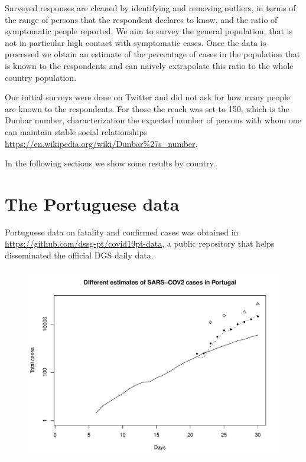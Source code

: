 \documentclass{article}
\begin{document}
Surveyed responses are cleaned by identifying and removing outliers, in terms of the range of persons that the respondent declares to know, and the ratio of symptomatic people reported. We aim to survey the general population, that is not in particular high contact with symptomatic cases. Once the data is processed we obtain an estimate of the percentage of cases in the population that is known to the respondents and can naively extrapolate this ratio to the whole country population. 


Our initial surveys were done on Twitter and did not ask for how many people are known to the respondents. For those the reach was set to 150, which is the Dunbar number, characterization the expected number of persons with whom one can maintain stable social relationships \url{https://en.wikipedia.org/wiki/Dunbar%27s_number}. 

In the following sections we show some results by country. 

\section{The Portuguese data}

Portuguese data on fatality and confirmed cases was obtained in \url{https://github.com/dssg-pt/covid19pt-data}, a public repository that helps disseminated the official DGS daily data.

\begin{figure}
\begin{center}
\includegraphics[width=.9\linewidth]{EstPTMar26.pdf}
\end{center}
\end{figure}
\end{document}

